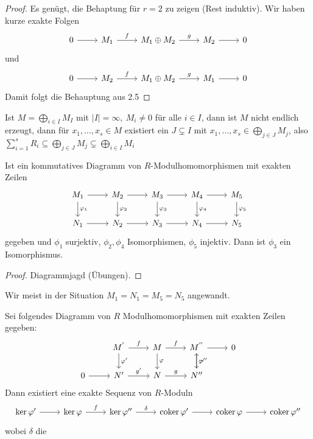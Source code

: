 \begin{proof}
	Es genügt, die Behaptung für $r=2$ zu zeigen (Rest induktiv). Wir haben kurze exakte Folgen $$\begin{tikzcd}
	0  \arrow{r} & M_1 \arrow{r}{f} & M_1 \oplus M_2 \arrow{r}{g} & M_2 \arrow{r} & 0
	\end{tikzcd} $$
	 und
	$$\begin{tikzcd}
	0  \arrow{r} & M_2 \arrow{r}{f} & M_1 \oplus M_2 \arrow{r}{g} & M_1 \arrow{r} & 0
	\end{tikzcd} $$
	Damit folgt die Behauptung aus 2.5
\end{proof}
\begin{anm}
	Ist $M= \bigoplus_{i\in I} M_I$ mit $|I| = \infty, \ M_i \neq 0$ für alle $i\in I$, dann ist $M$ nicht endlich erzeugt, dann für $x_1, \ldots, x_s\in M$ existiert ein $J\subsetneq I$ mit $ x_1, \ldots, x_s \in \bigoplus_{j\in J} M_j$, also $\sum_{i=1}^s R_i \subseteq \bigoplus_{j\in J} M_j\subsetneq \bigoplus_{i\in I} M_i$
\end{anm}
\begin{bem}[Fünferlemma] Ist ein kommutatives Diagramm von $R$-Modulhomomorphismen mit exakten Zeilen 
	$$\begin{tikzcd}
	M_1 \arrow{r} \arrow{d}{\phi_1}& M_2 \arrow{r}\arrow{d}{\phi_2}& M_3 \arrow{r} \arrow{d}{\phi_3} & M_4 \arrow{r} \arrow{d}{\phi_4} & M_5 \arrow{d}{\phi_5}\\
	N_1 \arrow{r}& N_2 \arrow{r}& N_3 \arrow{r} & N_4 \arrow{r} & N_5
	\end{tikzcd}$$
	gegeben und $\phi_1$ surjektiv, $\phi_2, \phi_4$ Isomorphismen, $\phi_5$ injektiv. Dann ist $\phi_3$ ein Isomorphismus.
\end{bem}
\begin{proof}
	Diagrammjagd (Übungen).
\end{proof}
\begin{anm}
	Wir meist in der Situation $M_1 = N_1 = M_5 = N_5$ angewandt.
\end{anm}
\begin{bem}[Schlangenlemma]
	Sei folgendes Diagramm von $R$ Modulhomomorphismen mit exakten Zeilen gegeben:
	$$\begin{tikzcd}
& M^{'} \arrow{r}{f}\arrow{d}{\phi'}& M \arrow{r}{f} \arrow{d}{\phi} & M^{''} \arrow{d}{\phi''} \arrow{r}& 0\\
	0 \arrow{r}& N' \arrow{r}{g'}& N \arrow{r}{g} & \arrow{u}[swap]{\sim}N''
	\end{tikzcd}$$
	Dann existiert eine exakte Sequenz von $R$-Moduln 
	$$\begin{tikzcd}
	\ker \phi'  \arrow{r} & \ker \phi \arrow{r}{f} & \ker \phi'' \arrow{r}{\delta} & \coker \phi'  \arrow{r} &  \coker \phi \arrow{r} & \coker \phi''
	\end{tikzcd} $$
	wobei $\delta$ die 
	
\end{bem}
